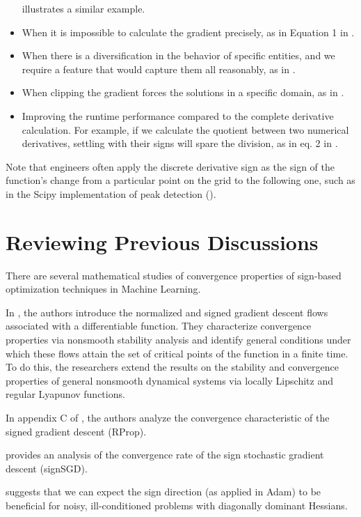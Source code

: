 \documentclass[11pt]{book}
\begin{document}
\begin{itemize}
illustrates a similar example.
\item When it is impossible to calculate the gradient precisely, as in Equation 1 in \cite{dong2018fast}.
\item When there is a diversification in the behavior of specific entities,
and we require a feature that would capture them all reasonably, as
in \cite{schramm2014dynamic}.
\item When clipping the gradient forces the solutions in a specific domain, as
in \cite{moosavi2019robustness}.
\item Improving the runtime performance compared to the complete derivative
calculation. For example, if we calculate the quotient between two
numerical derivatives, settling with their signs will spare the division,
as in eq. 2 in \cite{huang2017robust}.
\end{itemize}
Note that engineers often apply the discrete derivative sign as the
sign of the function's change from a particular point on the grid
to the following one, such as in the Scipy implementation of peak detection
(\cite{scipy2018}).


\chapter{Reviewing Previous Discussions}

There are several mathematical studies of convergence properties of sign-based
optimization techniques in Machine Learning.

In \cite{cortes2005achieving}, the authors introduce the normalized
and signed gradient descent flows associated with a differentiable
function. They characterize convergence properties via nonsmooth
stability analysis and identify general conditions under which
these flows attain the set of critical points of the function in a
finite time. To do this, the researchers extend the results on the stability and
convergence properties of general nonsmooth dynamical systems via
locally Lipschitz and regular Lyapunov functions.

In appendix C of \cite{karimi2016linear}, the authors analyze the
convergence characteristic of the signed gradient descent (RProp).

\cite{bernstein2018convergence} provides an analysis of the convergence
rate of the sign stochastic gradient descent (signSGD).

\cite{balles2018dissecting} suggests that we can expect the sign
direction (as applied in Adam) to be beneficial for noisy, ill-conditioned
problems with diagonally dominant Hessians.
\end{document}
